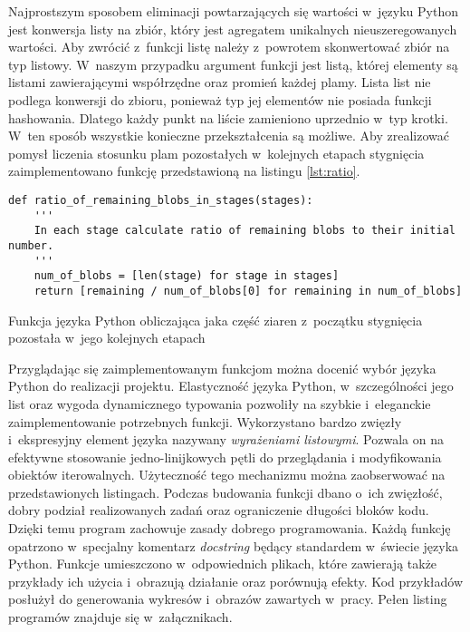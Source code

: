 Najprostszym sposobem eliminacji powtarzających się wartości w~języku Python
jest konwersja listy na zbiór, który jest agregatem unikalnych 
nieuszeregowanych wartości.
Aby zwrócić z~funkcji listę należy z~powrotem skonwertować zbiór na typ
listowy.
W~naszym przypadku argument funkcji jest listą, której elementy są listami
zawierającymi współrzędne oraz promień każdej plamy.
Lista list nie podlega konwersji do zbioru, ponieważ typ jej elementów
nie posiada funkcji hashowania.
Dlatego każdy punkt na liście zamieniono uprzednio w~typ krotki.
W~ten sposób wszystkie konieczne przekształcenia są możliwe.
Aby zrealizować pomysł liczenia stosunku plam pozostałych w~kolejnych etapach
stygnięcia zaimplementowano funkcję przedstawioną na listingu
\ref{lst:ratio}.
\begin{listing}[htb]
\begin{verbatim}
def ratio_of_remaining_blobs_in_stages(stages):
    '''
    In each stage calculate ratio of remaining blobs to their initial number.
    '''
    num_of_blobs = [len(stage) for stage in stages]
    return [remaining / num_of_blobs[0] for remaining in num_of_blobs]
\end{verbatim}
\caption{Funkcja języka Python obliczająca jaka część ziaren z~początku
         stygnięcia pozostała w~jego kolejnych etapach}
\label{lst:ratio}
\end{listing}

Przyglądając się zaimplementowanym funkcjom można docenić wybór języka
Python do realizacji projektu.
Elastyczność języka Python, w~szczególności jego list oraz wygoda
dynamicznego typowania pozwoliły na szybkie i~eleganckie zaimplementowanie
potrzebnych funkcji.
Wykorzystano bardzo zwięzły i~ekspresyjny element języka nazywany
\emph{wyrażeniami listowymi}.
Pozwala on na efektywne stosowanie jedno-linijkowych pętli do przeglądania
i modyfikowania obiektów iterowalnych.
Użyteczność tego mechanizmu można zaobserwować na przedstawionych listingach.
Podczas budowania funkcji dbano o~ich zwięzłość, dobry podział realizowanych
zadań oraz ograniczenie długości bloków kodu.
Dzięki temu program zachowuje zasady dobrego programowania.
Każdą funkcję opatrzono w~specjalny komentarz \emph{docstring} będący
standardem w~świecie języka Python.
Funkcje umieszczono w~odpowiednich plikach, które zawierają także
przykłady ich użycia i~obrazują działanie oraz porównują efekty.
Kod przykładów posłużył do generowania wykresów i~obrazów zawartych
w~pracy.
Pełen listing programów znajduje się w~załącznikach.

